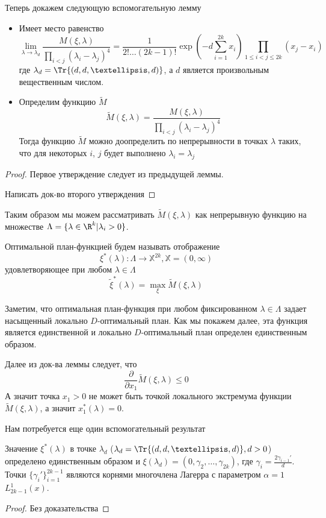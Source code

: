 Теперь докажем следующую вспомогательную лемму
\begin{lem}
\begin{itemize}
\item
Имеет место равенство
\begin{equation}
\lim \limits_{\lambda \rightarrow \lambda_d} \frac{M(\xi, \lambda)}{\prod\limits_{i < j}(\lambda_i - \lambda_j)^4} = \frac{1}{2!…(2k-1)!}\exp\left(-d\sum\limits_{i=1}^{2k}x_i\right)\prod\limits_{1 \leq i < j \leq 2k}(x_j - x_i)
\end{equation}
где $\lambda_d = \Tr{(d, d,…,d)}$, а $d$ является произвольным вещественным числом.

\item Определим функцию $\tilde{M}$
\begin{equation}
\tilde{M}(\xi, \lambda) = \frac{M(\xi, \lambda)}{\prod \limits_{i < j} (\lambda_i - \lambda_j)^4}
\end{equation}
Тогда функцию $\tilde{M}$ можно доопределить по непрерывности в точках $\lambda$  таких, что для некоторых $i$, $j$ будет выполнено $\lambda_i = \lambda_j$ 
\end{itemize}
\end{lem}
\begin{proof}
Первое утверждение следует из предыдущей леммы.

Написать док-во второго утверждения
\end{proof}


Таким образом мы можем рассматривать $\tilde{M}(\xi, \lambda)$ как непрерывную функцию на множестве $\Lambda = \{ \lambda \in \R^{k} | \lambda_i > 0\}$. 
\begin{dfn}
Оптимальной план-функцией будем называть отображение 
$$\xi^{*}(\lambda): \Lambda \rightarrow \mathbb{X}^{2k}, \mathbb{X} = (0, \infty)$$
удовлетворяющее при любом $\lambda \in \Lambda$
$$\tilde{\xi}^{*}(\lambda) = \max\limits_{\xi}\tilde{M}(\xi, \lambda)$$
\end{dfn}
Заметим, что оптимальная план-функция при любом фиксированном $\lambda \in \Lambda$  задает насыщенный локально $D$-оптимальный план. Как мы покажем далее, эта функция является единственной и локально $D$-оптимальный план определен единственным образом.

Далее из док-ва леммы следует, что 
$$\frac{\partial}{\partial x_1} \tilde{M}(\xi, \lambda) \leq 0$$
А значит точка $x_1 > 0$ не может быть точкой локального экстремума функции $\tilde{M}(\xi, \lambda)$, а значит $x_1^{*}(\lambda) = 0$. 

Нам потребуется еще один вспомогательный результат
\begin{lem}
Значение $\xi^{*}(\lambda)$ в точке $\lambda_d$ ($\lambda_d = \Tr{(d, d,…,d)}, d > 0$)  определено единственным образом и 
$\xi(\lambda_d) = (0, \gamma_2, …, \gamma_{2k})$, где $\gamma_i = \frac{2\gamma_{i-1}'}{d}$. Точки $\{ \gamma_i' \}_{i=1}^{2k-1}$ являются корнями многочлена Лагерра с параметром $\alpha = 1$ $L_{2k-1}^1(x)$.  
\end{lem}
\begin{proof}
Без доказательства
\end{proof}

